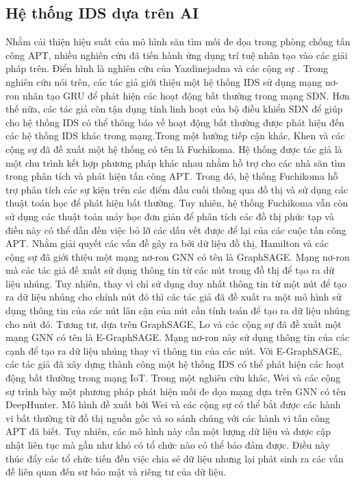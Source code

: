 
\subsection{{Hệ thống IDS dựa trên AI}}\label{chapter1:rel-works:xai-ids}

Nhằm cải thiện hiệu suất của mô hình săn tìm mối đe dọa trong phòng chống tấn công APT, nhiều nghiên cứu đã tiến hành ứng dụng trí tuệ nhân tạo vào các giải pháp trên. Điển hình là nghiên cứu của Yazdinejadna và các cộng sự \cite{yazdinejadna2021kangaroo}. Trong nghiên cứu nói trên, các tác giả giới thiệu một hệ thống IDS sử dụng mạng nơ-ron nhân tạo GRU để phát hiện các hoạt động bất thường trong mạng SDN. Hơn thế nữa, các tác giả còn tận dụng tính linh hoạt của bộ điều khiển SDN để giúp cho hệ thống IDS có thể thông báo về hoạt động bất thường được phát hiện đến các hệ thống IDS khác trong mạng.Trong một hướng tiếp cận khác, Khen và các cộng sự \cite{chen2022building} đã đề xuất một hệ thống có tên là Fuchikoma. Hệ thống được tác giả là một chu trình kết hợp phương pháp khác nhau nhằm hỗ trợ cho các nhà săn tìm trong phân tích và phát hiện tấn công APT. Trong đó, hệ thống Fuchikoma hỗ trợ phân tích các sự kiện trên các điểm đầu cuối thông qua đồ thị và sử dụng các thuật toán học để phát hiện bất thường. Tuy nhiên, hệ thống Fuchikoma vẫn còn sử dụng các thuật toán máy học đơn giản để phân tích các đồ thị phức tạp và điều này có thể dẫn đến việc bỏ lỡ các dấu vết được để lại của các cuộc tấn công APT. Nhằm giải quyết các vấn đề gây ra bởi dữ liệu đồ thị, Hamilton và các cộng sự \cite{hamilton2017inductive} đã giới thiệu một mạng nơ-ron GNN có tên là GraphSAGE. Mạng nơ-ron mà các tác giả đề xuất sử dụng thông tin từ các nút trong đồ thị để tạo ra dữ liệu nhúng. Tuy nhiên, thay vì chỉ sử dụng duy nhất thông tin từ một nút để tạo ra dữ liệu nhúng cho chính nút đó thì các tác giả đã đề xuất ra một mô hình sử dụng thông tin của các nút lân cận của nút cần tính toán để tạo ra dữ liệu nhúng cho nút đó. Tương tư, dựa trên GraphSAGE, Lo và các cộng sự \cite{lo2022graphsage} đã đề xuất một mạng GNN có tên là E-GraphSAGE. Mạng nơ-ron này sử dụng thông tin của các cạnh để tạo ra dữ liệu nhúng thay vì thông tin của các nút. Với E-GraphSAGE, các tác giả đã xây dựng thành công một hệ thống IDS có thể phát hiện các hoạt động bất thường trong mạng IoT. Trong một nghiên cứu khác, Wei và các cộng sự \cite{wei2021deephunter} trình bày một phương pháp phát hiện mối đe dọa mạng dựa trên GNN có tên DeepHunter. Mô hình đề xuất bởi Wei và các cộng sự có thể bắt được các hành vi bất thường từ đồ thị nguồn gốc và so sánh chúng với các hành vi tấn công APT đã biết. Tuy nhiên, các mô hình này cần một lượng dữ liệu và được cập nhật liên tục mà gần như khó có tổ chức nào có thể bảo đảm được. Điều này thúc đẩy các tổ chức tiến đến việc chia sẻ dữ liệu nhưng lại phát sinh ra các vấn đề liên quan đến sư bảo mật và riêng tư của dữ liệu.



